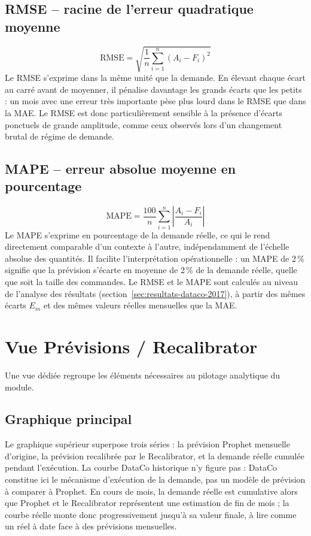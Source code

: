 \documentclass[11pt,a4paper]{article}
\begin{document}
\subsection{RMSE -- racine de l'erreur quadratique moyenne}
\[
\mathrm{RMSE} = \sqrt{\frac{1}{n}\sum_{i=1}^{n} (A_i - F_i)^2}
\]
Le RMSE s'exprime dans la même unité que la demande. En élevant chaque écart au carré avant de moyenner, il pénalise davantage les grands écarts que les petits : un mois avec une erreur très importante pèse plus lourd dans le RMSE que dans la MAE. Le RMSE est donc particulièrement sensible à la présence d'écarts ponctuels de grande amplitude, comme ceux observés lors d'un changement brutal de régime de demande.

\subsection{MAPE -- erreur absolue moyenne en pourcentage}
\[
\mathrm{MAPE} = \frac{100}{n}\sum_{i=1}^{n} \left|\frac{A_i - F_i}{A_i}\right|
\]
Le MAPE s'exprime en pourcentage de la demande réelle, ce qui le rend directement comparable d'un contexte à l'autre, indépendamment de l'échelle absolue des quantités. Il facilite l'interprétation opérationnelle : un MAPE de 2\,\% signifie que la prévision s'écarte en moyenne de 2\,\% de la demande réelle, quelle que soit la taille des commandes. Le RMSE et le MAPE sont calculés au niveau de l'analyse des résultats (section~\ref{sec:resultats-dataco-2017}), à partir des mêmes écarts \(E_m\) et des mêmes valeurs réelles mensuelles que la MAE.

\section{Vue Prévisions / Recalibrator}

Une vue dédiée regroupe les éléments nécessaires au pilotage analytique du module.

\subsection{Graphique principal}

Le graphique supérieur superpose trois séries : la prévision Prophet mensuelle d'origine, la prévision recalibrée par le Recalibrator, et la demande réelle cumulée pendant l'exécution. La courbe DataCo historique n'y figure pas : DataCo constitue ici le mécanisme d'exécution de la demande, pas un modèle de prévision à comparer à Prophet. En cours de mois, la demande réelle est cumulative alors que Prophet et le Recalibrator représentent une estimation de fin de mois ; la courbe réelle monte donc progressivement jusqu'à sa valeur finale, à lire comme un réel à date face à des prévisions mensuelles.
\end{document}
